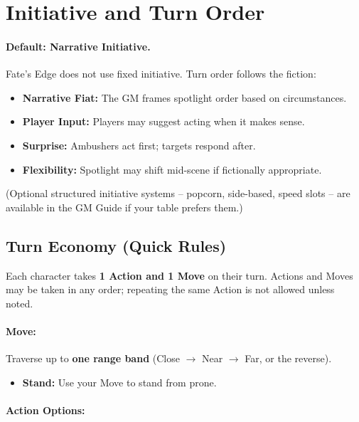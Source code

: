 \section{Initiative and Turn Order}
\label{sec:initiative}

\paragraph{Default: Narrative Initiative.} Fate's Edge does not use fixed initiative. Turn order follows the fiction:

\begin{itemize}
  \item \textbf{Narrative Fiat:} The GM frames spotlight order based on circumstances.
  \item \textbf{Player Input:} Players may suggest acting when it makes sense.
  \item \textbf{Surprise:} Ambushers act first; targets respond after.
  \item \textbf{Flexibility:} Spotlight may shift mid-scene if fictionally appropriate.
\end{itemize}

\noindent (Optional structured initiative systems -- popcorn, side-based, speed slots -- are available in the GM Guide if your table prefers them.)

\subsection{Turn Economy (Quick Rules)}
\label{sec:turn-economy}

Each character takes \textbf{1 Action and 1 Move} on their turn. Actions and Moves may be taken in any order; repeating the same Action is not allowed unless noted.

\paragraph{Move:}
Traverse up to \textbf{one range band} (Close $\rightarrow$ Near $\rightarrow$ Far, or the reverse).
\begin{itemize}
  \item \textbf{Stand:} Use your Move to stand from prone.
\end{itemize}

\paragraph{Action Options:}

